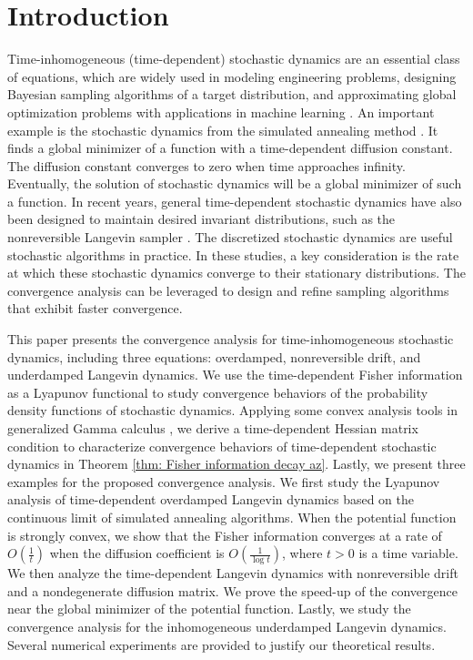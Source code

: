 \documentclass[11pt,reqno]{amsart}
\begin{document}
\section{Introduction}
Time-inhomogeneous (time-dependent) stochastic dynamics are an essential class of equations, which are widely used in modeling engineering problems, designing Bayesian sampling algorithms of a target distribution, and approximating global optimization problems with applications in machine learning \cite{CH87,GH86,MCJ,TangZhou2021}. An important example is the stochastic dynamics from the simulated annealing method \cite{Cer85,KGV83}. It finds a global minimizer of a function with a time-dependent diffusion constant. The diffusion constant converges to zero when time approaches infinity. Eventually, the solution of stochastic dynamics will be a global minimizer of such a function. In recent years, general time-dependent stochastic dynamics have also been designed to maintain desired invariant distributions, such as the nonreversible Langevin sampler \cite{DLP,DPZ, ZMS}. The discretized stochastic dynamics are useful stochastic algorithms in practice. In these studies, a key consideration is the rate at which these stochastic dynamics converge to their stationary distributions. The convergence analysis can be leveraged to design and refine sampling algorithms that exhibit faster convergence.


This paper presents the convergence analysis for time-inhomogeneous stochastic dynamics, including three equations: overdamped, nonreversible drift, and underdamped Langevin dynamics. We use the time-dependent Fisher information as a Lyapunov functional to study convergence behaviors of the probability density functions of stochastic dynamics. Applying some convex analysis tools in generalized Gamma calculus \cite{FengLi, FengLi2021}, we derive a time-dependent Hessian matrix condition to characterize convergence behaviors of time-dependent stochastic dynamics in Theorem \ref{thm: Fisher information decay az}. 
Lastly, we present three examples for the proposed convergence analysis. We first study the Lyapunov analysis of time-dependent overdamped Langevin dynamics based on the continuous limit of simulated annealing algorithms. When the potential function is strongly convex, we show that the Fisher information converges at a rate of $O(\frac{1}{t})$ when the diffusion coefficient is $O(\frac{1}{\log t})$, where $t>0$ is a time variable. We then analyze the time-dependent Langevin dynamics with nonreversible drift and a nondegenerate diffusion matrix. We prove the speed-up of the convergence near the global minimizer of the potential function. Lastly, we study the convergence analysis for the inhomogeneous underdamped Langevin dynamics. Several numerical experiments are provided to justify our theoretical results. 
\end{document}
